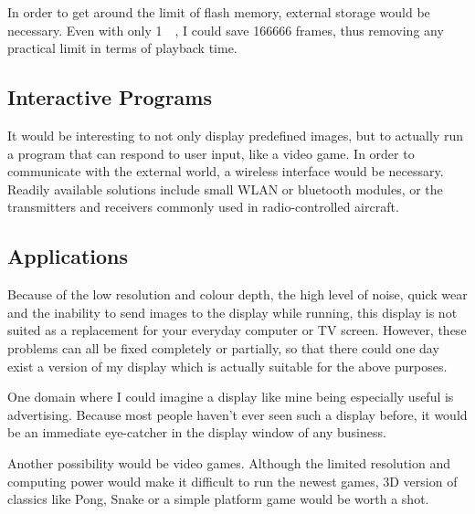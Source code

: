 \documentclass[a4paper, 11pt, titlepage]{report}
\begin{document}
In order to get around the limit of flash memory, external storage would be necessary. Even with
only \SI{1}{\giga\byte}, I could save 166666 frames, thus removing any practical limit in terms of
playback time.

\subsection{Interactive Programs}

It would be interesting to not only display predefined images, but to actually run a program that
can respond to user input, like a video game. In order to communicate with the external world, a
wireless interface would be necessary. Readily available solutions include small WLAN or bluetooth
modules, or the transmitters and receivers commonly used in radio-controlled aircraft.

\subsection{Applications}

Because of the low resolution and colour depth, the high level of noise, quick wear and the
inability to send images to the display while running, this display is not suited as a replacement
for your everyday computer or TV screen. However, these problems can all be fixed completely or
partially, so that there could one day exist a version of my display which is actually suitable
for the above purposes.

One domain where I could imagine a display like mine being especially useful is advertising.
Because most people haven't ever seen such a display before, it would be an immediate eye-catcher
in the display window of any business.

Another possibility would be video games. Although the limited resolution and computing power
would make it difficult to run the newest games, 3D version of classics like Pong, Snake or a
simple platform game would be worth a shot.
\end{document}
